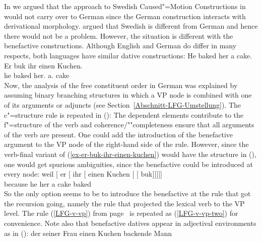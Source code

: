 In \citet{MWArgSt} we argued that the approach to Swedish Caused"=Motion Constructions in
\citet{ADT2008a,ADT2013a} would not carry over to German since the German construction interacts with derivational
morphology. \citet{AT2014a} argued that Swedish is different from German and hence there would not
be a problem. However, the situation is different with the benefactive constructions. Although
English and German do differ in many respects, both languages have similar dative constructions:
\eal
\ex He baked her a cake.
\ex
\label{ex-er-buk-ihr-einen-kuchen} 
\gll Er buk   ihr        einen Kuchen.\\
     he baked her.\dat{} a.\acc{} cake\\
\zl
Now, the analysis of the free constituent order in German was explained by assuming binary branching
structures in which a VP node is combined with one of its arguments or adjuncts (see
Section~\ref{Abschnitt-LFG-Umstellung}). The c"=structure rule is repeated in ():
\ea
\label{lfg-vp-regel-two}
\z
The dependent elements contribute to the f"=structure of the verb and coherence/""completeness ensure that all
arguments of the verb are present. One could add the introduction of the benefactive argument to
the VP node of the right-hand side of the rule. However, since the verb-final variant of
(\ref{ex-er-buk-ihr-einen-kuchen}) would have the structure in (), one would get spurious
ambiguities, since the benefactive could be introduced at every node:
\ea
\gll weil    [ er [ ihr [ einen Kuchen [ [ buk]]]]]\\
     because {}        he {}        her {}        a cake       {}        {}       baked\\
\z
So the only option seems to be to introduce the benefactive at the rule that got the recursion
going, namely the rule that projected the lexical verb to the VP level. The rule (\ref{LFG-v-vp})
from page~\pageref{LFG-v-vp} is repeated as (\ref{LFG-v-vp-two}) for convenience.
\ea
\label{LFG-v-vp-two}
\z
Note also that benefactive datives appear in adjectival environments as in ():
\eal
\ex
\gll der seiner Frau einen Kuchen backende Mann\\
